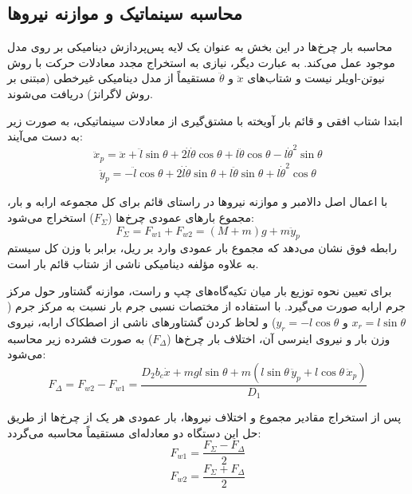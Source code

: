\subsection{محاسبه سینماتیک و موازنه نیروها}
محاسبه بار چرخ‌ها در این بخش به عنوان یک لایه پس‌پردازش دینامیکی بر روی مدل موجود عمل می‌کند. به عبارت دیگر، نیازی به استخراج مجدد معادلات حرکت با روش نیوتن-اویلر نیست و شتاب‌های $\ddot{x}$ و $\ddot{\theta}$ مستقیماً از مدل دینامیکی غیرخطی (مبتنی بر روش لاگرانژ) دریافت می‌شوند.

ابتدا شتاب افقی و قائم بار آویخته با مشتق‌گیری از معادلات سینماتیکی، به صورت زیر به دست می‌آیند:
\begin{equation}
    \ddot{x}_p = \ddot{x} + \ddot{l}\sin\theta + 2\dot{l}\dot{\theta}\cos\theta + l\ddot{\theta}\cos\theta - l\dot{\theta}^2\sin\theta
\end{equation}
\begin{equation}
    \ddot{y}_p = -\ddot{l}\cos\theta + 2\dot{l}\dot{\theta}\sin\theta + l\ddot{\theta}\sin\theta + l\dot{\theta}^2\cos\theta
\end{equation}

با اعمال اصل دالامبر و موازنه نیروها در راستای قائم برای کل مجموعه ارابه و بار، مجموع بارهای عمودی چرخ‌ها ($F_\Sigma$) استخراج می‌شود:
\begin{equation}
    F_\Sigma = F_{w1} + F_{w2} = (M+m)g + m\ddot{y}_p
\end{equation}
رابطه فوق نشان می‌دهد که مجموع بار عمودی وارد بر ریل، برابر با وزن کل سیستم به علاوه مؤلفه دینامیکی ناشی از شتاب قائم بار است.

برای تعیین نحوه توزیع بار میان تکیه‌گاه‌های چپ و راست، موازنه گشتاور حول مرکز جرم ارابه صورت می‌گیرد. با استفاده از مختصات نسبی جرم بار نسبت به مرکز جرم ($x_r = l\sin\theta$ و $y_r = -l\cos\theta$) و لحاظ کردن گشتاورهای ناشی از اصطکاک ارابه، نیروی وزن بار و نیروی اینرسی آن، اختلاف بار چرخ‌ها ($F_\Delta$) به صورت فشرده زیر محاسبه می‌شود:
\begin{equation}
    F_\Delta = F_{w2} - F_{w1} = \frac{D_2 b_c \dot{x} + m g l \sin\theta + m\left( l\sin\theta\,\ddot{y}_p + l\cos\theta\,\ddot{x}_p \right)}{D_1}
\end{equation}

پس از استخراج مقادیر مجموع و اختلاف نیروها، بار عمودی هر یک از چرخ‌ها از طریق حل این دستگاه دو معادله‌ای مستقیماً محاسبه می‌گردد:
\begin{equation}
    F_{w1} = \frac{F_\Sigma - F_\Delta}{2}
\end{equation}
\begin{equation}
    F_{w2} = \frac{F_\Sigma + F_\Delta}{2}
\end{equation}

